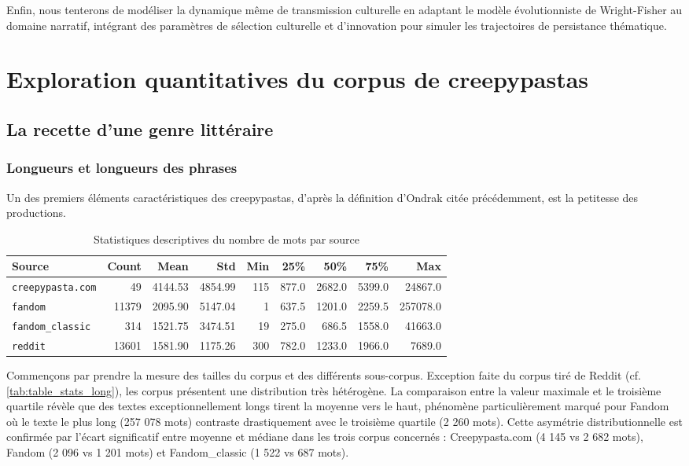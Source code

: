 \documentclass[12pt,a4paper,oneside,titlepage]{book} %
\begin{document}
Enfin, nous tenterons de modéliser la dynamique même de transmission culturelle en adaptant le modèle évolutionniste de Wright-Fisher au domaine narratif, intégrant des paramètres de sélection culturelle et d'innovation pour simuler les trajectoires de persistance thématique.



	\part{Exploration quantitatives du corpus de creepypastas}
	
	\chapter{La recette d'une genre littéraire}

	
	\section{Longueurs et longueurs des phrases}
	Un des premiers éléments caractéristiques des creepypastas, d'après la définition d'Ondrak citée précédemment, est la petitesse des productions. 

    \begin{table}[htbp]
\centering

\begin{tabular}{lrrrrrrrr}
\toprule
\textbf{Source} & \textbf{Count} & \textbf{Mean} & \textbf{Std} & \textbf{Min} & \textbf{25\%} & \textbf{50\%} & \textbf{75\%} & \textbf{Max} \\
\midrule
\texttt{creepypasta.com} & 49 & 4144.53 & 4854.99 & 115 & 877.0 & 2682.0 & 5399.0 & 24867.0 \\
\texttt{fandom}          & 11379 & 2095.90 & 5147.04 & 1 & 637.5 & 1201.0 & 2259.5 & 257078.0 \\
\texttt{fandom\_classic} & 314 & 1521.75 & 3474.51 & 19 & 275.0 & 686.5 & 1558.0 & 41663.0 \\
\texttt{reddit}          & 13601 & 1581.90 & 1175.26 & 300 & 782.0 & 1233.0 & 1966.0 & 7689.0 \\
\bottomrule
\end{tabular}
\caption{Statistiques descriptives du nombre de mots par source}
\label{table:stats_long}
\end{table}


Commençons par prendre la mesure des tailles du corpus et des différents sous-corpus. Exception faite du corpus tiré de Reddit (cf. \ref{tab:table_stats_long}), les corpus présentent une distribution très hétérogène. La comparaison entre la valeur maximale et le troisième quartile révèle que des textes exceptionnellement longs tirent la moyenne vers le haut, phénomène particulièrement marqué pour Fandom où le texte le plus long (257 078 mots) contraste drastiquement avec le troisième quartile (2 260 mots). Cette asymétrie distributionnelle est confirmée par l'écart significatif entre moyenne et médiane dans les trois corpus concernés : Creepypasta.com (4 145 vs 2 682 mots), Fandom (2 096 vs 1 201 mots) et Fandom\_classic (1 522 vs 687 mots).
\end{document}
